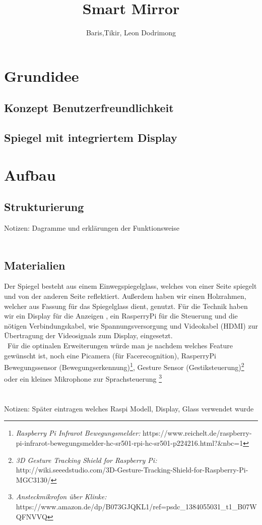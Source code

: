 \documentclass[a4paper,11pt]{article}
\author{Baris,Tikir, Leon Dodrimong}
\title{Smart Mirror}
\begin{document}
\maketitle
\newpage
\tableofcontents
\newpage


\section{Grundidee}

\subsection{Konzept Benutzerfreundlichkeit}
\subsection{Spiegel mit integriertem Display}


\section{Aufbau}
\subsection{Strukturierung}
Notizen: Dagramme und erklärungen der Funktionsweise\\\
\subsection{Materialien}
Der Spiegel besteht aus einem Einwegspiegelglass, welches von einer Seite spiegelt und von der anderen Seite reflektiert. Außerdem haben wir einen Holzrahmen, welcher aus Fassung für das Spiegelglass dient, genutzt. Für die Technik haben wir ein Display für die Anzeigen , ein RasperryPi für die Steuerung und die nötigen Verbindungskabel, wie Spannungsversorgung und Videokabel (HDMI) zur Übertragung der Videosignals zum Display, eingesetzt.\\\
Für die optinalen Erweiterungen würde man je nachdem welches Feature gewünscht ist, noch eine Picamera (für Facerecognition), RasperryPi Bewegungssensor (Bewegungserkennung)\footnote{\textit{ Raspberry Pi Infrarot Bewegungsmelder:} https://www.reichelt.de/raspberry-pi-infrarot-bewegungsmelder-hc-sr501-rpi-hc-sr501-p224216.html?\&nbc=1}, Gesture Sensor (Gestiksteuerung)\footnote{\textit{3D Gesture Tracking Shield for Raspberry Pi:}  http://wiki.seeedstudio.com/3D-Gesture-Tracking-Shield-for-Raspberry-Pi-MGC3130/} oder ein kleines Mikrophone zur Sprachsteuerung \footnote{\textit{Ansteckmikrofon über Klinke:} https://www.amazon.de/dp/B073GJQKL1/ref=psdc\_1384055031\_t1\_B07WQFNVVQ}
\\\\\\
Notizen: Später eintragen welches Raspi Modell, Display, Glass verwendet wurde
\end{document}
